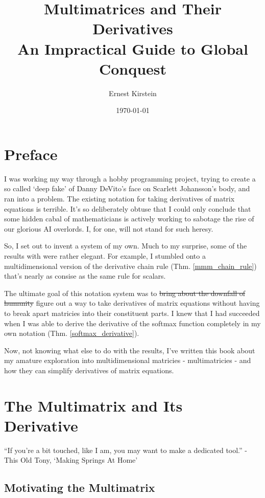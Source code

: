 \documentclass[12pt]{book}
\title{%
  Multimatrices and Their Derivatives \\
  \large An Impractical Guide to Global Conquest}
\author{Ernest Kirstein}
\date{\today}
\theoremstyle{plain}
\theoremstyle{definition}
\theoremstyle{ppart}
\theoremstyle{case}
\theoremstyle{solution}
\begin{document}
\maketitle

\chapter*{Preface}
I was working my way through a hobby programming project, trying to create a so called
`deep fake' of Danny DeVito's face on Scarlett Johansson's body, and ran into a problem.
The existing notation for taking derivatives of matrix equations is terrible.
It's so deliberately obtuse that I could only conclude that some hidden cabal of
mathematicians is actively working to sabotage the rise of our glorious AI overlords.
I, for one, will not stand for such heresy.

So, I set out to invent a system of my own. Much to my surprise, some of the
results with were rather elegant. For example, I stumbled onto a
multidimensional version of the derivative chain rule (Thm. \ref{mmm_chain_rule})
that's nearly as consise as the same rule for scalars.

The ultimate goal of this notation system was to \sout{bring about the downfall
of humanity} figure out a way to take derivatives
of matrix equations without having to break apart matricies into their constituent
parts. I knew that I had succeeded when I was able to derive the derivative of the
softmax function completely in my own notation (Thm. \ref{softmax_derivative}).

Now, not knowing what else to do with the results, I've written this book
about my amature exploration into multidimensional matricies -
multimatricies - and how they can simplify derivatives of matrix equations.

\tableofcontents

\chapter{The Multimatrix and Its Derivative}

\begin{displayquote}
``If you're a bit touched, like I am, you may want to make a dedicated tool.'' -
This Old Tony, `Making Springs At Home' \cite{youtube:tony}
\end{displayquote}

\section{Motivating the Multimatrix}
\end{document}
